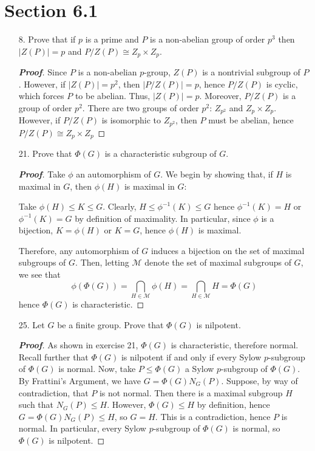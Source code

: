 \documentclass[12pt,leqno]{book}
\theoremstyle{definition}
\newenvironment{Proof}{\begin{proof}[\textnormal{\textbf{Proof}}]}{\end{proof}}
\begin{document}
\section*{Section 6.1}
\begin{enumerate}
 \item [8.] Prove that if $p$ is a prime and $P$ is a non-abelian group of order $p^3$ then $|Z(P)|=p$ and $P/Z(P)\cong Z_p\times Z_p$.

\begin{Proof}
 Since $P$ is a non-abelian $p$-group, $Z(P)$ is a nontrivial subgroup of $P$. However, if $|Z(P)|=p^2$, then $|P/Z(P)|=p$, hence $P/Z(P)$ is cyclic, which forces $P$ to be abelian. Thus, $|Z(P)|=p$. Moreover, $P/Z(P)$ is a group of order $p^2$. There are two groups of order $p^2$: $Z_{p^2}$ and $Z_p\times Z_p$. However, if $P/Z(P)$ is isomorphic to $Z_{p^2}$, then $P$ must be abelian, hence $P/Z(P)\cong Z_p\times Z_p$
\end{Proof}

 \item [21.] Prove that $\Phi(G)$ is a characteristic subgroup of $G$.

\begin{Proof}
 Take $\phi$ an automorphism of $G$. We begin by showing that, if $H$ is maximal in $G$, then $\phi(H)$ is maximal in $G$:

Take $\phi(H)\leq K\leq G$. Clearly, $H\leq\phi^{-1}(K)\leq G$ hence $\phi^{-1}(K)=H$ or $\phi^{-1}(K)=G$ by definition of maximality. In particular, since $\phi$ is a bijection, $K=\phi(H)$ or $K=G$, hence $\phi(H)$ is maximal.

Therefore, any automorphism of $G$ induces a bijection on the set of maximal subgroups of $G$. Then, letting $\mathcal{M}$ denote the set of maximal subgroups of $G$, we see that \[\phi(\Phi(G))=\bigcap_{H\in\mathcal{M}}\phi(H)=\bigcap_{H\in\mathcal{M}}H=\Phi(G)\] hence $\Phi(G)$ is characteristic.
\end{Proof}

 \item [25.] Let $G$ be a finite group. Prove that $\Phi(G)$ is nilpotent.

\begin{Proof}
 As shown in exercise 21, $\Phi(G)$ is characteristic, therefore normal. Recall further that $\Phi(G)$ is nilpotent if and only if every Sylow $p$-subgroup of $\Phi(G)$ is normal. Now, take $P\leq\Phi(G)$ a Sylow $p$-subgroup of $\Phi(G)$. By Frattini's Argument, we have $G=\Phi(G)N_G(P)$. Suppose, by way of contradiction, that $P$ is not normal. Then there is a maximal subgroup $H$ such that $N_G(P)\leq H$. However, $\Phi(G)\leq H$ by definition, hence $G=\Phi(G)N_G(P)\leq H$, so $G=H$. This is a contradiction, hence $P$ is normal. In particular, every Sylow $p$-subgroup of $\Phi(G)$ is normal, so $\Phi(G)$ is nilpotent.
\end{Proof}

\end{enumerate}
\end{document}
